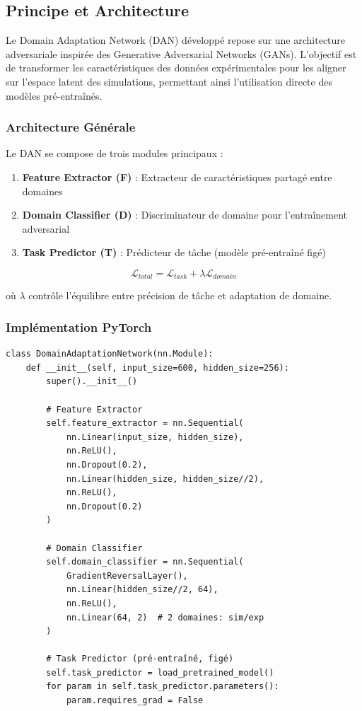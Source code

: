 \documentclass[twocolumn,10pt]{article}
\begin{document}
\subsection{Principe et Architecture}

Le Domain Adaptation Network (DAN) développé repose sur une architecture adversariale inspirée des Generative Adversarial Networks (GANs). L'objectif est de transformer les caractéristiques des données expérimentales pour les aligner sur l'espace latent des simulations, permettant ainsi l'utilisation directe des modèles pré-entraînés.

\subsubsection{Architecture Générale}

Le DAN se compose de trois modules principaux :

\begin{enumerate}
\item \textbf{Feature Extractor (F)} : Extracteur de caractéristiques partagé entre domaines
\item \textbf{Domain Classifier (D)} : Discriminateur de domaine pour l'entraînement adversarial
\item \textbf{Task Predictor (T)} : Prédicteur de tâche (modèle pré-entraîné figé)
\end{enumerate}

\begin{equation}
\mathcal{L}_{total} = \mathcal{L}_{task} + \lambda \mathcal{L}_{domain}
\end{equation}

où $\lambda$ contrôle l'équilibre entre précision de tâche et adaptation de domaine.

\subsubsection{Implémentation PyTorch}

\begin{lstlisting}[style=python, caption=Architecture du Domain Adaptation Network]
class DomainAdaptationNetwork(nn.Module):
    def __init__(self, input_size=600, hidden_size=256):
        super().__init__()

        # Feature Extractor
        self.feature_extractor = nn.Sequential(
            nn.Linear(input_size, hidden_size),
            nn.ReLU(),
            nn.Dropout(0.2),
            nn.Linear(hidden_size, hidden_size//2),
            nn.ReLU(),
            nn.Dropout(0.2)
        )

        # Domain Classifier
        self.domain_classifier = nn.Sequential(
            GradientReversalLayer(),
            nn.Linear(hidden_size//2, 64),
            nn.ReLU(),
            nn.Linear(64, 2)  # 2 domaines: sim/exp
        )

        # Task Predictor (pré-entraîné, figé)
        self.task_predictor = load_pretrained_model()
        for param in self.task_predictor.parameters():
            param.requires_grad = False
\end{lstlisting}
\end{document}

